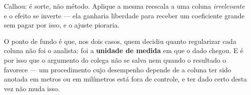 \begin{solucao}
Calhou: é sorte, não método. Aplique a mesma reescala a uma coluna
\emph{irrelevante} e o efeito se inverte --- ela ganharia liberdade para receber um
coeficiente grande sem pagar por isso, e o ajuste pioraria.

O ponto de fundo é que, nos dois casos, quem decidiu quanto regularizar cada
coluna não foi o analista: foi a \textbf{unidade de medida} em que o dado chegou.
E é por isso que o argumento do colega não se salva nem quando o resultado o
favorece --- um procedimento cujo desempenho depende de a coluna ter sido anotada
em metros ou em milímetros está fora de controle, e ter dado certo desta vez não
muda isso.
\end{solucao}
